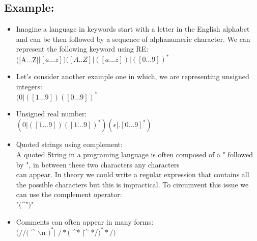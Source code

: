 \documentclass[20pt]{article}
\begin{document}
\begin{itemize}
		    \subsection*{Example:}
		    	\begin{itemize}
				\item Imagine a language in keywords start with a letter in the English alphabet and can be then followed by a sequence of alphanumeric
				character. We can represent the following keyword using RE: \\
				([A...Z]$|[a...z])([A..Z]|([a...z])|([0...9])^*$
				\item Let's consider another example one in which, we are representing unsigned integers:\\
				$(0|([1...9])([0...9])^*$
				\item Unsigned real number: \\
					$(0|([1...9])([1...9])^*)(\epsilon| .[0...9]^*)$
				\item Quoted strings using complement:\\
					A quoted String in a programing language is often composed of a " followed by ", in between these two characters any characters\\
					can appear. In theory we could write a regular expression that contains all the possible characters but this is impractical.
					To circumvent this issue we can use the complement operator:\\
					"$($\^{}"$)$"\\
                \item Comments can often appear in many forms:\\
                    $(//($ \^{}  $\backslash$n $)^*|$
                    $/*($ \^{}* $|$\^{}  */$)^* */)$
                 
                     
                \end{itemize}
			
                    \end{itemize}
\end{document}
